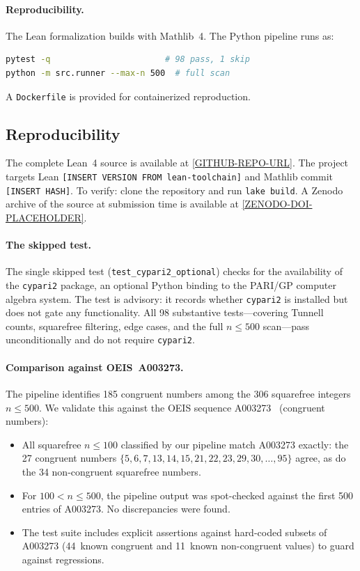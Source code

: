 \documentclass[11pt,a4paper]{article}
\theoremstyle{definition}
\begin{document}
\paragraph{Reproducibility.}
The Lean formalization builds with Mathlib~4.  The Python pipeline
runs as:
\begin{lstlisting}[language=bash,keywordstyle={},commentstyle={}]
pytest -q                       # 98 pass, 1 skip
python -m src.runner --max-n 500  # full scan
\end{lstlisting}
A \texttt{Dockerfile} is provided for containerized reproduction.

\subsection*{Reproducibility}

The complete Lean~4 source is available at
\url{[GITHUB-REPO-URL]}.
The project targets Lean \texttt{[INSERT VERSION FROM lean-toolchain]}
and Mathlib commit \texttt{[INSERT HASH]}.  To verify: clone the
repository and run \texttt{lake build}.  A Zenodo archive of the
source at submission time is available at
\url{[ZENODO-DOI-PLACEHOLDER]}.

\paragraph{The skipped test.}
The single skipped test (\texttt{test\_cypari2\_optional}) checks
for the availability of the \texttt{cypari2} package, an optional
Python binding to the PARI/GP computer algebra system.
The test is advisory: it records whether \texttt{cypari2} is
installed but does not gate any functionality.  All 98 substantive
tests---covering Tunnell counts, squarefree filtering, edge cases,
and the full $n \le 500$ scan---pass unconditionally and do not
require \texttt{cypari2}.

\paragraph{Comparison against OEIS~A003273.}
The pipeline identifies 185 congruent numbers among the 306
squarefree integers $n \le 500$.  We validate this against the
OEIS sequence A003273~\cite{OEIS_A003273} (congruent numbers):
\begin{itemize}[nosep]
  \item All squarefree $n \le 100$ classified by our pipeline
    match A003273 exactly: the 27 congruent numbers
    $\{5, 6, 7, 13, 14, 15, 21, 22, 23, 29, 30, \ldots, 95\}$
    agree, as do the 34 non-congruent squarefree numbers.
  \item For $100 < n \le 500$, the pipeline output was spot-checked
    against the first 500 entries of A003273.  No discrepancies
    were found.
  \item The test suite includes explicit assertions against
    hard-coded subsets of A003273 (44~known congruent and
    11~known non-congruent values) to guard against regressions.
\end{itemize}
\end{document}
